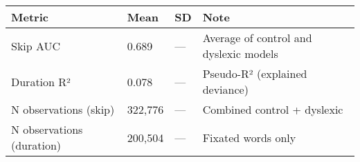 \begin{tabular}{llll}
\toprule
Metric & Mean & SD & Note \\
\midrule
Skip AUC & 0.689 & — & Average of control and dyslexic models \\
Duration R² & 0.078 & — & Pseudo-R² (explained deviance) \\
N observations (skip) & 322,776 & — & Combined control + dyslexic \\
N observations (duration) & 200,504 & — & Fixated words only \\
\bottomrule
\end{tabular}
